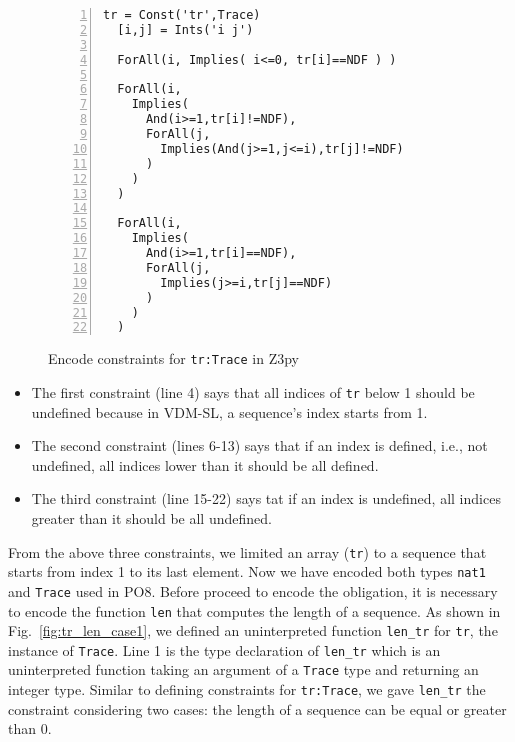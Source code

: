 \begin{figure}[t]
\begin{center}
\begin{mdframed}[roundcorner=5pt,shadow=true]
\begin{Verbatim}[fontsize=\small,numbers=left]
  tr = Const('tr',Trace)
  [i,j] = Ints('i j')

  ForAll(i, Implies( i<=0, tr[i]==NDF ) )

  ForAll(i,
    Implies(
      And(i>=1,tr[i]!=NDF),
      ForAll(j,
        Implies(And(j>=1,j<=i),tr[j]!=NDF)
      )
    )
  )

  ForAll(i,
    Implies(
      And(i>=1,tr[i]==NDF),
      ForAll(j,
        Implies(j>=i,tr[j]==NDF)
      )
    )
  )
\end{Verbatim}
\end{mdframed}
\vspace{-10pt}
\caption{Encode constraints for {\tt tr:Trace} in Z3py}
\label{fig:tr_constraint_case1}
\end{center}
\vspace{-20pt}
\end{figure}



\begin{itemize}
\item
The first constraint (line 4) says that all indices of {\tt tr} below 1 should be undefined because in VDM-SL, a sequence's index starts from 1.
\item
The second constraint (lines 6-13) says that if an index is defined, i.e., not undefined, all indices lower than it should be all defined.
\item
The third constraint (line 15-22) says tat if an index is undefined, all indices greater than it should be all undefined.
\end{itemize}

From the above three constraints, we limited an array ({\tt tr}) to a sequence that starts from index 1 to its last element. Now we have encoded both types {\tt nat1} and {\tt Trace} used in PO8. Before proceed to encode the obligation, it is necessary to encode the function {\tt len} that computes the length of a sequence. As shown in Fig.~\ref{fig:tr_len_case1}, we defined an uninterpreted function {\tt len\_tr} for {\tt tr}, the instance of {\tt Trace}. Line 1 is the type declaration of {\tt len\_tr} which is an uninterpreted function taking an argument of a {\tt Trace} type and returning an integer type. Similar to defining constraints for {\tt tr:Trace}, we gave {\tt len\_tr} the constraint considering two cases: the length of a sequence can be equal or greater than 0.


